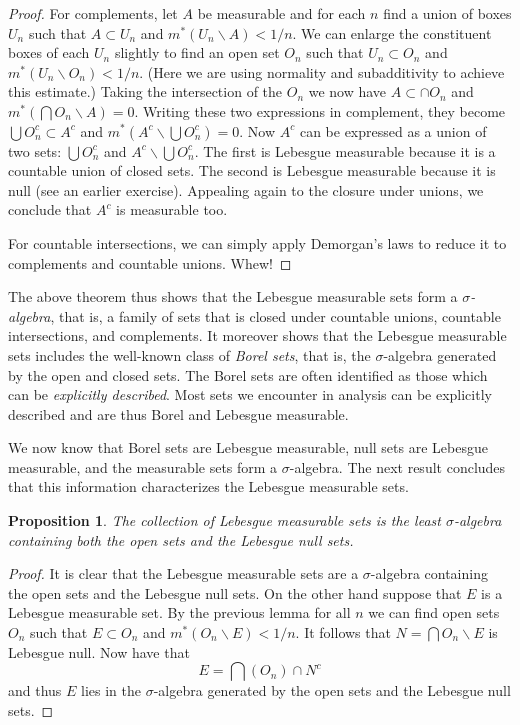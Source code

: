 \documentclass[10pt,oneside]{amsbook}
\renewcommand{\setminus}{\smallsetminus}
\theoremstyle{definition}
\theoremstyle{plain}
\newtheorem{prop}[thm]{Proposition}
\theoremstyle{definition}
\theoremstyle{remark}
\numberwithin{equation}{section}
\numberwithin{figure}{section}
\begin{document}
\begin{proof}
  For complements, let $A$ be measurable and for each $n$ find a union of boxes $U_n$ such that $A\subset U_n$ and $m^*(U_n\setminus A)<1/n$. We can enlarge the constituent boxes of each $U_n$ slightly to find an open set $O_n$ such that $U_n\subset O_n$ and $m^*(U_n\setminus O_n)<1/n$. (Here we are using normality and subadditivity to achieve this estimate.) Taking the intersection of the $O_n$ we now have $A\subset\cap O_n$ and $m^*(\bigcap O_n\setminus A)=0$. Writing these two expressions in complement, they become $\bigcup O_n^c\subset A^c$ and $m^*(A^c\setminus\bigcup O_n^c)=0$. Now $A^c$ can be expressed as a union of two sets: $\bigcup O_n^c$ and $A^c\setminus\bigcup O_n^c$. The first is Lebesgue measurable because it is a countable union of closed sets. The second is Lebesgue measurable because it is null (see an earlier exercise). Appealing again to the closure under unions, we conclude that $A^c$ is measurable too.

  For countable intersections, we can simply apply Demorgan's laws to reduce it to complements and countable unions. Whew!
\end{proof}

The above theorem thus shows that the Lebesgue measurable sets form a \emph{$\sigma$-algebra}, that is, a family of sets that is closed under countable unions, countable intersections, and complements. It moreover shows that the Lebesgue measurable sets includes the well-known class of \emph{Borel sets}, that is, the $\sigma$-algebra generated by the open and closed sets. The Borel sets are often identified as those which can be \emph{explicitly described}. Most sets we encounter in analysis can be explicitly described and are thus Borel and Lebesgue measurable.

We now know that Borel sets are Lebesgue measurable, null sets are Lebesgue measurable, and the measurable sets form a $\sigma$-algebra. The next result concludes that this information characterizes the Lebesgue measurable sets.

\begin{prop}
  The collection of Lebesgue measurable sets is the least $\sigma$-algebra containing both the open sets and the Lebesgue null sets.
\end{prop}

\begin{proof}
  It is clear that the Lebesgue measurable sets are a $\sigma$-algebra containing the open sets and the Lebesgue null sets. On the other hand suppose that $E$ is a Lebesgue measurable set. By the previous lemma for all $n$ we can find open sets $O_n$ such that $E\subset O_n$ and $m^*(O_n\setminus E)<1/n$. It follows that $N=\bigcap O_n\setminus E$ is Lebesgue null. Now have that
  \[E=\bigcap(O_n)\cap N^c
  \]
  and thus $E$ lies in the $\sigma$-algebra generated by the open sets and the Lebesgue null sets.
\end{proof}
\end{document}
